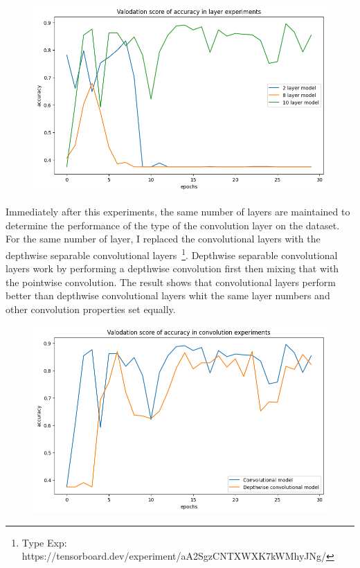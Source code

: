 \begin{figure}[H]
    \centering
    \includegraphics[width=\textwidth]{img/layerexpaccuracy.png}
    \caption{}
    \label{fig:layerexpacc}
\end{figure}

Immediately after this experiments, the same number of layers are maintained to determine the performance of the type of the convolution layer on the dataset.
For the same number of layer, I replaced the convolutional layers with the depthwise separable convolutional layers~\footnote{Type Exp: https://tensorboard.dev/experiment/aA2SgzCNTXWXK7kWMhyJNg/}.
Depthwise separable convolutional layers work by performing a depthwise convolution first then mixing that with the pointwise convolution.
The result shows that convolutional layers perform better than depthwise convolutional layers whit the same layer numbers and other convolution properties set equally.

\begin{figure}[H]
    \centering
    \includegraphics[width=.8\textwidth]{img/deptoconvexpaccuracy.png}
    \caption{}
    \label{fig:depttoconvacc}
\end{figure}

